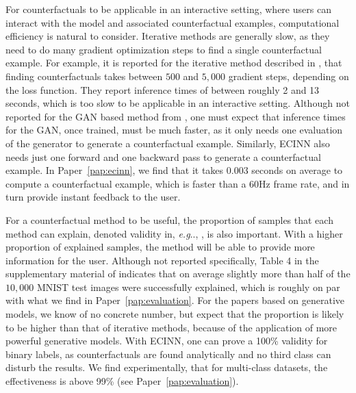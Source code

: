 \documentclass[11pt,a4paper,twoside,openright,final]{memoir}
\makeatletter
\DeclareRobustCommand\onedot{\futurelet\@let@token\@onedot}
\def\@onedot{\ifx\@let@token.\else.\null\fi\xspace}
\def\eg{\emph{e.g}\onedot} \def\Eg{\emph{E.g}\onedot}
\newcommand*{\paperref}[1]{Paper~\hyperref[#1]{\ref{#1}}}
\makeatother
\begin{document}
For counterfactuals to be applicable in an interactive setting, where users can interact with the model and associated counterfactual examples, computational efficiency is natural to consider.
Iterative methods are generally slow, as they need to do many gradient optimization steps to find a single counterfactual example.
For example, it is reported for the iterative method described in \cite{VanLooveren2019}, that finding counterfactuals takes between $500$ and $5,000$ gradient steps, depending on the loss function. 
They report inference times of between roughly 2 and 13 seconds, which is too slow to be applicable in an interactive setting.
Although not reported for the GAN based method from \cite{Singla2019}, one must expect that inference times for the GAN, once trained, must be much faster, as it only needs one evaluation of the generator to generate a counterfactual example.
Similarly, ECINN also needs just one forward and one backward pass to generate a counterfactual example.
In \paperref{pap:ecinn}, we find that it takes $0.003$ seconds on average to compute a counterfactual example, which is faster than a 60Hz frame rate, and in turn provide instant feedback to the user.

For a counterfactual method to be useful, the proportion of samples that each method can explain, denoted validity in, \eg, \cite{Mothilal2020}, is also important.
With a higher proportion of explained samples, the method will be able to provide more information for the user.
Although not reported specifically, Table 4 in the supplementary material of \citet{VanLooveren2019} indicates that on average slightly more than half of the $10,000$ MNIST test images were successfully explained, which is roughly on par with what we find in \paperref{pap:evaluation}.
For the papers based on generative models, we know of no concrete number, but expect that the proportion is likely to be higher than that of iterative methods, because of the application of more powerful generative models. 
With ECINN, one can prove a 100\% validity for binary labels, as counterfactuals are found analytically and no third class can disturb the results. 
We find experimentally, that for multi-class datasets, the effectiveness is above 99\% (see \paperref{pap:evaluation}). 
\end{document}
